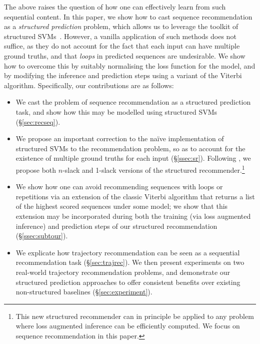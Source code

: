 The above raises the question of how one can effectively learn from such sequential content.
In this paper, we show how to cast sequence recommendation as a \emph{structured prediction} problem,
which allows us to leverage the toolkit of structured SVMs~\citep{tsochantaridis2005large}.
However, a vanilla application of such methods does not suffice,
as they do not account for the fact that each input can have multiple ground truths,
and that \emph{loops} in predicted sequences are undesirable.
We show how to overcome this by
suitably normalising the loss function for the model,
and by modifying the inference and prediction steps using a variant of the Viterbi algorithm.
Specifically, our contributions are as follows:
\begin{itemize}[noitemsep,leftmargin=12pt]\itemmoveup
	\item We cast the problem of sequence recommendation as a structured prediction task, and show how this may be modelled using structured SVMs (\S\ref{sec:recseq}).
	\item We propose an important correction to the na\"{i}ve implementation of structured SVMs to the recommendation problem, so as to account for the existence of multiple ground truths for each input (\S\ref{ssec:sr}). Following \citep{joachims2009cutting}, we propose both $n$-slack and 1-slack versions of the structured recommender.\footnote{This new structured recommender can in principle be applied to any problem where loss augmented inference can be efficiently computed. We focus on sequence recommendation in this paper.}
	\item We show how one can avoid recommending sequences with loops or repetitions via an extension of the classic Viterbi algorithm that returns a list of the highest scored sequences under some model; we show that this extension may be incorporated during both the training (via loss augmented inference) and prediction steps of our structured recommendation (\S\ref{ssec:subtour}).
	\item We explicate how trajectory recommendation can be seen as a sequential recommendation task (\S\ref{sec:trajrec}). We then present experiments on two real-world trajectory recommendation problems, and demonstrate our structured prediction approaches to offer consistent benefits over existing non-structured baselines (\S\ref{sec:experiment}).\itemmoveup
\end{itemize}

